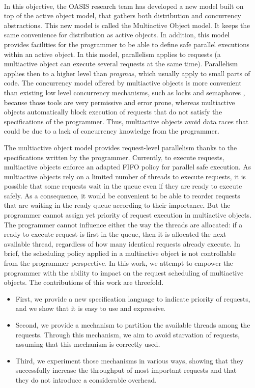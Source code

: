 \documentclass[11pt]{report}
\begin{document}
\paragraph{}
In this objective, the OASIS research team has developed a new model built on top of the active object model, that gathers both distribution and concurrency abstractions. This new model is called the Multiactive Object model. It keeps the same convenience for distribution as active objects. In addition, this model provides facilities for the programmer to be able to define safe parallel executions within an active object. In this model, parallelism applies to requests (a multiactive object can execute several requests at the same time). Parallelism applies then to a higher level than \emph{pragmas}, which usually apply to small parts of code. The concurrency model offered by multiactive objects is more convenient than existing low level concurrency mechanisms, such as locks and semaphores \cite{ref:semaphore},
because those tools are very permissive and error prone, whereas multiactive objects automatically block execution of requests that do not satisfy the specifications of the programmer.
Thus, multiactive objects avoid data races that could be due to a lack of concurrency knowledge from the programmer.

The multiactive object model provides request-level parallelism thanks to the specifications written by the programmer.
Currently, to execute requests, multiactive objects enforce an adapted FIFO policy for parallel safe execution. As multiactive objects rely on a limited number of threads to execute requests, it is possible that some requests wait in the queue even if they are ready to execute safely.
As a consequence, it would be convenient to be able to reorder requests that are waiting in the ready queue according to their importance. But the programmer cannot assign yet priority of request execution in multiactive objects. The programmer cannot influence either the way the threads are allocated: if a ready-to-execute request is first in the queue, then it is allocated the next available thread, regardless of how many identical requests already execute. In brief, the scheduling policy applied in a multiactive object is not controllable from the programmer perspective. In this work, we attempt to empower the programmer with the ability to impact on the request scheduling of multiactive objects. The contributions of this work are  threefold. 

\begin{itemize}
\item First, we  provide a new specification language to indicate priority of requests, and we show that it is easy to use and expressive.
\item Second, we provide a mechanism to partition the available threads among the requests. Through this mechanism, we aim to avoid starvation of requests, assuming that this mechanism is correctly used.
\item Third, we experiment those mechanisms in various ways, showing that they successfully increase the throughput of most important requests and that they do not introduce a considerable overhead.
\end{itemize}
\end{document}
